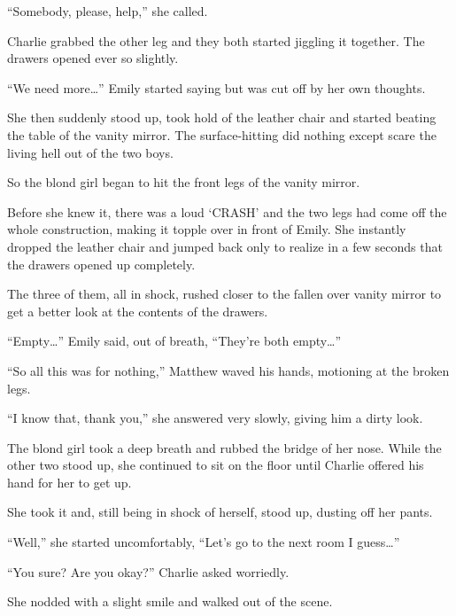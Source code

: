 “Somebody, please, help,” she called.

Charlie grabbed the other leg and they both started jiggling it together. The drawers opened ever so slightly.

“We need more…” Emily started saying but was cut off by her own thoughts.

She then suddenly stood up, took hold of the leather chair and started beating the table of the vanity mirror. The surface-hitting did nothing except scare the living hell out of the two boys.

So the blond girl began to hit the front legs of the vanity mirror.

Before she knew it, there was a loud ‘CRASH' and the two legs had come off the whole construction, making it topple over in front of Emily. She instantly dropped the leather chair and jumped back only to realize in a few seconds that the drawers opened up completely.

The three of them, all in shock, rushed closer to the fallen over vanity mirror to get a better look at the contents of the drawers.

“Empty…” Emily said, out of breath, “They're both empty…”

“So all this was for nothing,” Matthew waved his hands, motioning at the broken legs.

“I know that, thank you,” she answered very slowly, giving him a dirty look.

The blond girl took a deep breath and rubbed the bridge of her nose. While the other two stood up, she continued to sit on the floor until Charlie offered his hand for her to get up.

She took it and, still being in shock of herself, stood up, dusting off her pants.

“Well,” she started uncomfortably, “Let's go to the next room I guess…”

“You sure? Are you okay?” Charlie asked worriedly.

She nodded with a slight smile and walked out of the scene.